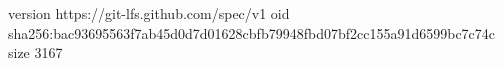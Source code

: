 version https://git-lfs.github.com/spec/v1
oid sha256:bac93695563f7ab45d0d7d01628cbfb79948fbd07bf2cc155a91d6599bc7c74c
size 3167
